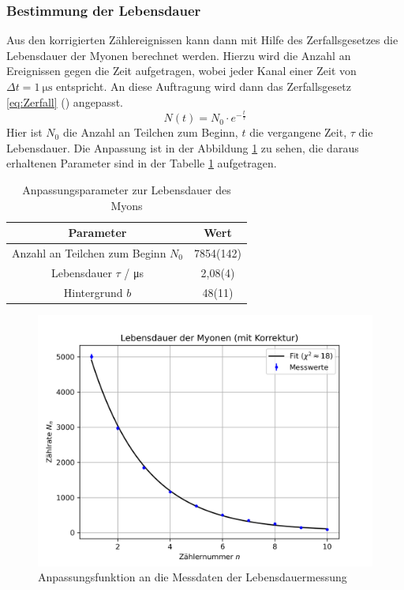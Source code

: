 \documentclass{article}
\begin{document}
\subsubsection*{Bestimmung der Lebensdauer}
Aus den korrigierten Zählereignissen kann dann mit Hilfe des Zerfallsgesetzes die Lebensdauer der Myonen berechnet werden.
Hierzu wird die Anzahl an Ereignissen gegen die Zeit aufgetragen, wobei jeder Kanal einer Zeit von $\Delta t=\SI{1}{\micro\s}$ entspricht.
An diese Auftragung wird dann das Zerfallsgesetz \ref{eq:Zerfall} (\cite{Zerfallsgesetz}) angepasst.
\begin{equation}
    N(t)=N_0\cdot e^{-\frac{t}{\tau}}
\end{equation}
Hier ist $N_0$ die Anzahl an Teilchen zum Beginn, $t$ die vergangene Zeit, $\tau$ die Lebensdauer.
Die Anpassung ist in der Abbildung \ref{fig:LebensdauerFit} zu sehen, die daraus erhaltenen Parameter sind in der Tabelle \ref{tab:ParameterLebensdauerFit} aufgetragen.
\begin{table}[H]
    \centering
    \caption{Anpassungsparameter zur Lebensdauer des Myons}
    \begin{tabular}{|c|c|}
        \hline
        Parameter & Wert \\ \hline \hline
        Anzahl an Teilchen zum Beginn $N_0$  & 7854(142) \\ \hline
        Lebensdauer $\tau$ / \si{\micro\second} & 2,08(4) \\ \hline
        Hintergrund $b$  & 48(11) \\ \hline
    \end{tabular}
    \label{tab:ParameterLebensdauerFit}
\end{table}

\begin{figure}[H]
    \centering
    \includegraphics[width=1\textwidth]{figures/Lebensdauer_fit_korrektur.png}
    \caption{Anpassungsfunktion an die Messdaten der Lebensdauermessung}
    \label{fig:LebensdauerFit}
\end{figure}
\end{document}
